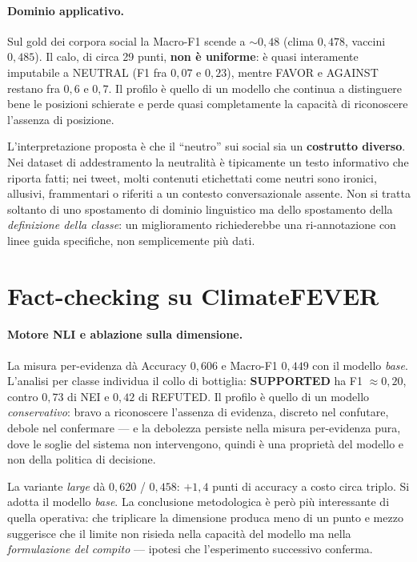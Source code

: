 \documentclass[11pt,a4paper]{report}
\begin{document}
\paragraph{Dominio applicativo.}\label{sec:ris-stance-social}
Sul gold dei corpora social la Macro-F1 scende a $\sim\!0{,}48$ (clima $0{,}478$, vaccini
$0{,}485$). Il calo, di circa 29 punti, \textbf{non è uniforme}: è quasi interamente imputabile a
NEUTRAL (F1 fra $0{,}07$ e $0{,}23$), mentre FAVOR e AGAINST restano fra $0{,}6$ e $0{,}7$. Il
profilo è quello di un modello che continua a distinguere bene le posizioni schierate e perde quasi
completamente la capacità di riconoscere l'assenza di posizione.

L'interpretazione proposta è che il ``neutro'' sui social sia un \textbf{costrutto diverso}. Nei
dataset di addestramento la neutralità è tipicamente un testo informativo che riporta fatti; nei
tweet, molti contenuti etichettati come neutri sono ironici, allusivi, frammentari o riferiti a un
contesto conversazionale assente. Non si tratta soltanto di uno spostamento di dominio linguistico
ma dello spostamento della \emph{definizione della classe}: un miglioramento richiederebbe una
ri-annotazione con linee guida specifiche, non semplicemente più dati.

\section{Fact-checking su ClimateFEVER}

\paragraph{Motore NLI e ablazione sulla dimensione.}\label{sec:ris-ablazione}
La misura per-evidenza dà Accuracy $0{,}606$ e Macro-F1 $0{,}449$ con il modello \emph{base}.
L'analisi per classe individua il collo di bottiglia: \textbf{SUPPORTED} ha F1 $\approx 0{,}20$,
contro $0{,}73$ di NEI e $0{,}42$ di REFUTED. Il profilo è quello di un modello
\emph{conservativo}: bravo a riconoscere l'assenza di evidenza, discreto nel confutare, debole nel
confermare --- e la debolezza persiste nella misura per-evidenza pura, dove le soglie del sistema
non intervengono, quindi è una proprietà del modello e non della politica di decisione.

La variante \emph{large} dà $0{,}620$ / $0{,}458$: $+1{,}4$ punti di accuracy a costo circa triplo.
Si adotta il modello \emph{base}. La conclusione metodologica è però più interessante di quella
operativa: che triplicare la dimensione produca meno di un punto e mezzo suggerisce che il limite
non risieda nella capacità del modello ma nella \emph{formulazione del compito} --- ipotesi che
l'esperimento successivo conferma.
\end{document}
